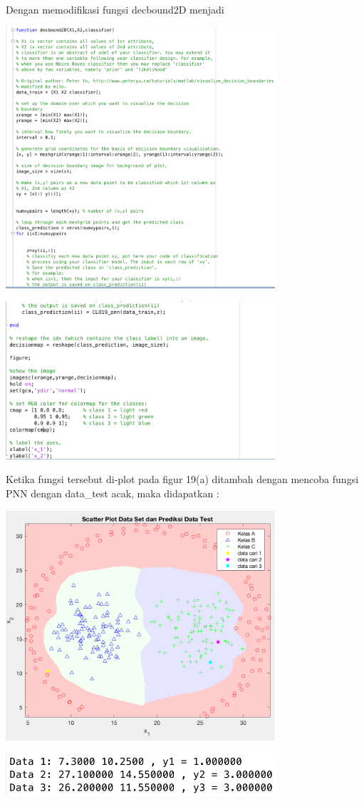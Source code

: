 \documentclass[12pt]{article}%
\begin{document}
\begin{enumerate}
\begin{enumerate}
		\par Dengan memodifikasi fungsi decbound2D menjadi 

		\par \includegraphics[width=10cm]{ass2clo3no19_6}
		\par \includegraphics[width=10cm]{ass2clo3no19_7}  

		\par Ketika fungsi tersebut di-plot pada figur 19(a) ditambah dengan mencoba fungsi PNN dengan data\_test acak, maka didapatkan :
		\par \includegraphics[width=10cm]{ass2clo3no19_8}
		\par \includegraphics[width=10cm]{ass2clo3no19_9}  


\end{enumerate}
\end{enumerate}
\end{document}
